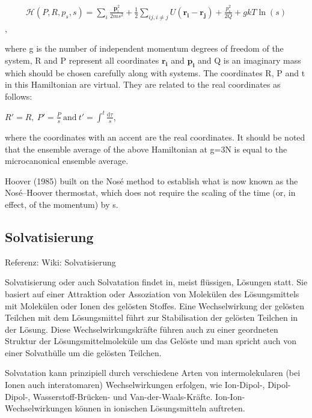 \documentclass[]{article}
\begin{document}
\begin{align*}
	\mathcal{H} (P,R,p_s,s) = \sum_i\frac{\mathbf{p}_i^2}{2ms^2} + \frac12 \sum_{ij,i\not= j} U \left( \mathbf{r_i} - \mathbf{r_j}\right) + \frac{p_s^2}{2Q} + gkT\ln\left( s\right)
\end{align*}  ,

where g is the number of independent momentum degrees of freedom of the system, R and P represent all coordinates $\mathbf{r_i}$ and $\mathbf{p_i}$ and Q is an imaginary mass which should be chosen carefully along with systems. The coordinates R, P and t in this Hamiltonian are virtual. They are related to the real coordinates as follows:

$R'=R,~ P'=\frac{P}{s} ~\text{and}~t'=\int^t \frac{\mathrm{d}\tau}{s}$,

where the coordinates with an accent are the real coordinates. It should be noted that the ensemble average of the above Hamiltonian at g=3N is equal to the microcanonical ensemble average.

Hoover (1985) built on the Nosé method to establish what is now known as the Nosé–Hoover thermostat, which does not require the scaling of the time (or, in effect, of the momentum) by s.

\subsection{Solvatisierung}
Referenz: Wiki: Solvatisierung

Solvatisierung oder auch Solvatation findet in, meist flüssigen, Lösungen statt. Sie basiert auf einer Attraktion oder Assoziation von Molekülen des Lösungsmittels mit Molekülen oder Ionen des gelösten Stoffes. Eine Wechselwirkung der gelösten Teilchen mit dem Lösungsmittel führt zur Stabilisation der gelösten Teilchen in der Lösung. Diese Wechselwirkungskräfte führen auch zu einer geordneten Struktur der Lösungsmittelmoleküle um das Gelöste und man spricht auch von einer Solvathülle um die gelösten Teilchen.

Solvatation kann prinzipiell durch verschiedene Arten von intermolekularen (bei Ionen auch interatomaren) Wechselwirkungen erfolgen, wie Ion-Dipol-, Dipol-Dipol-, Wasserstoff-Brücken- und Van-der-Waals-Kräfte. Ion-Ion-Wechselwirkungen können in ionischen Lösungsmitteln auftreten.
\end{document}
